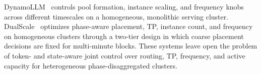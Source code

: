 DynamoLLM~\cite{stojkovic2024dynamollm} controls pool formation, instance scaling, and frequency knobs across different timescales on a homogeneous, monolithic serving cluster.
DualScale~\cite{biscale2025} optimizes phase-aware placement, TP, instance count, and frequency on homogeneous clusters through a two-tier design in which coarse placement decisions are fixed for multi-minute blocks. 
These systems leave open the problem of token- and state-aware joint control over routing, TP, frequency, and active capacity for heterogeneous phase-disaggregated clusters.




